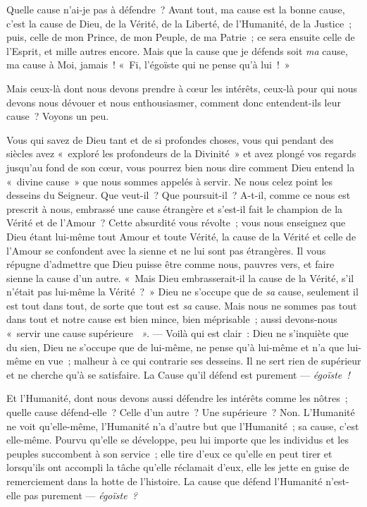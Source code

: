 \documentclass[french,twoside]{book} %
\begin{document}
\noindent Quelle cause n’ai-je pas à défendre ? Avant tout, ma cause est la bonne cause, c’est la cause de Dieu, de la Vérité, de la Liberté, de l’Humanité, de la Justice ; puis, celle de mon Prince, de mon Peuple, de ma Patrie ; ce sera ensuite celle de l’Esprit, et mille autres encore. Mais que la cause que je défends soit \emph{ma} cause, ma cause à Moi, jamais ! « Fi, l’égoïste qui ne pense qu’à lui ! »\par
Mais ceux-là dont nous devons prendre à cœur les intérêts, ceux-là pour qui nous devons nous dévouer et nous enthousiasmer, comment donc entendent-ils leur cause ? Voyons un peu.\par
Vous qui savez de Dieu tant et de si profondes choses, vous qui pendant des siècles avez « exploré les profondeurs de la Divinité » et avez plongé vos regards jusqu’au fond de son cœur, vous pourrez bien nous dire comment Dieu entend la « divine cause » que nous sommes appelés à servir. Ne nous celez point les desseins du Seigneur. Que veut-il ? Que poursuit-il ? A-t-il, comme ce nous est prescrit à nous, embrassé une cause étrangère et s’est-il fait le champion de la Vérité et de l’Amour ? Cette absurdité vous révolte ; vous nous enseignez que Dieu étant lui-même tout Amour et toute Vérité, la cause de la  Vérité et celle de l’Amour se confondent avec la sienne et ne lui sont pas étrangères. Il vous répugne d’admettre que Dieu puisse être comme nous, pauvres vers, et faire sienne la cause d’un autre. « Mais Dieu embrasserait-il la cause de la Vérité, s’il n’était pas lui-même la Vérité ? » Dieu ne s’occupe que de \emph{sa }cause, seulement il est tout dans tout, de sorte que tout est \emph{sa} cause. Mais nous ne sommes pas tout dans tout et notre cause est bien mince, bien méprisable ; aussi devons-nous « servir une cause supérieure \emph{ ».} — Voilà qui est clair : Dieu ne s’inquiète que du sien, Dieu ne s’occupe que de lui-même, ne pense qu’à lui-même et n’a que lui-même en vue ; malheur à ce qui contrarie ses desseins. Il ne sert rien de supérieur et ne cherche qu’à se satisfaire. La Cause qu’il défend est purement — \emph{égoïste !}\par
Et l’Humanité, dont nous devons aussi défendre les intérêts comme les nôtres ; quelle cause défend-elle ? Celle d’un autre ? Une supérieure ? Non. L’Humanité ne voit qu’elle-même, l’Humanité n’a d’autre but que l’Humanité ; sa cause, c’est elle-même. Pourvu qu’elle se développe, peu lui importe que les individus et les peuples succombent à son service ; elle tire d’eux ce qu’elle en peut tirer et lorsqu’ils ont accompli la tâche qu’elle réclamait d’eux, elle les jette en guise de remerciement dans la hotte de l’histoire. La cause que défend l’Humanité n’est-elle pas purement — \emph{égoïste ?}\par
\end{document}
